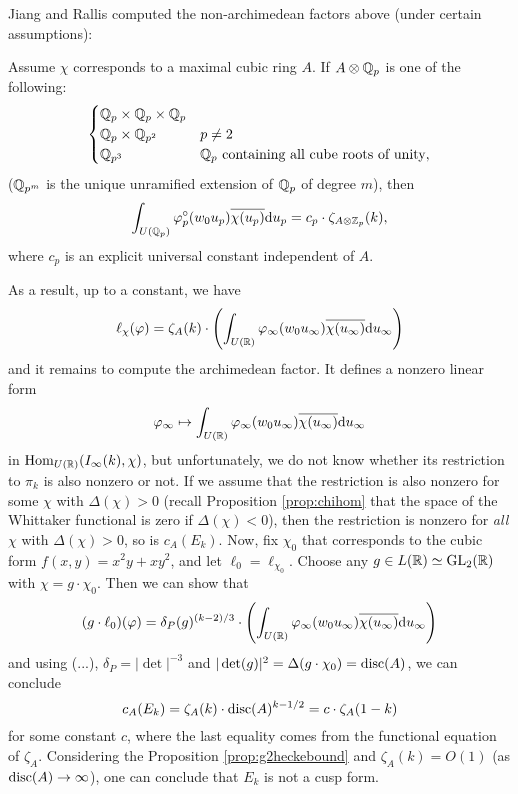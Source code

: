 Jiang and Rallis \cite{jiang1997fourier} computed the non-archimedean factors above (under certain assumptions):
\begin{proposition}
Assume $\chi$ corresponds to a maximal cubic ring $A$.
If $A \otimes \mathbb{Q}_p$ is one of the following:
$$
\begin{cases}
    \mathbb{Q}_p \times \mathbb{Q}_p \times \mathbb{Q}_p \\
    \mathbb{Q}_p \times \mathbb{Q}_{p^2} & p \ne 2\\
    \mathbb{Q}_{p^3} & \mathbb{Q}_p \text{ containing all cube roots of unity},
\end{cases}
$$
($\mathbb{Q}_{p^m}$ is the unique unramified extension of $\mathbb{Q}_p$ of degree $m$),
then
$$
\int_{U(\mathbb{Q}_p)} \varphi_p^\circ( w_0 u_p) \overline{\chi(u_p)} \mathrm{d} u_p = c_p \cdot \zeta_{A \otimes \mathbb{Z}_p}(k),
$$
where $c_p$ is an explicit universal constant independent of $A$.
\end{proposition}
As a result, up to a constant, we have
$$
\ell_\chi(\varphi) = \zeta_A(k) \cdot \left(\int_{U(\mathbb{R})} \varphi_\infty(w_0 u_\infty) \overline{\chi(u_\infty)}\mathrm{d} u_\infty\right)
$$
and it remains to compute the archimedean factor.
It defines a nonzero linear form
$$
\varphi_\infty \mapsto \int_{U(\mathbb{R})} \varphi_\infty(w_0 u_\infty) \overline{\chi(u_\infty)}\mathrm{d} u_\infty
$$
in $\mathrm{Hom}_{U(\mathbb{R})}(I_\infty(k), \chi)$, but unfortunately, we do not know whether its restriction to $\pi_k$ is also nonzero or not.
If we assume that the restriction is also nonzero for some $\chi$ with $\Delta(\chi) > 0$ (recall Proposition \ref{prop:chihom} that the space of the Whittaker functional is zero if $\Delta(\chi) < 0$), then the restriction is nonzero for \emph{all} $\chi$ with $\Delta(\chi) > 0$, so is $c_A(E_k)$.
Now, fix $\chi_0$ that corresponds to the cubic form $f(x, y) = x^2 y + xy^2$, and let $\ell_0 = \ell_{\chi_0}$.
Choose any $g \in L(\mathbb{R}) \simeq \mathrm{GL}_2(\mathbb{R})$ with $\chi = g \cdot \chi_0$.
Then we can show that
$$
(g \cdot \ell_0)(\varphi) = \delta_P(g)^{(k-2)/3} \cdot \left(\int_{U(\mathbb{R})} \varphi_\infty(w_0 u_\infty) \overline{\chi(u_\infty)}\mathrm{d} u_\infty\right)
$$
and using (...), $\delta_P = |\det|^{-3}$ and $|\det(g)|^2 = \Delta(g \cdot \chi_0) = \mathrm{disc}(A)$, we can conclude
$$
c_A(E_k) = \zeta_A(k) \cdot \mathrm{disc}(A)^{k - 1/2} = c \cdot \zeta_A(1 - k)
$$
for some constant $c$, where the last equality comes from the functional equation of $\zeta_A$.
Considering the Proposition \ref{prop:g2heckebound} and $\zeta_A(k) = O(1)$ (as $\mathrm{disc}(A) \to \infty$), one can conclude that $E_k$ is not a cusp form.

